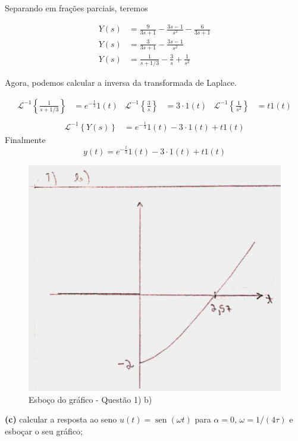 \documentclass{article}
\DeclareMathOperator{\sen}{sen}
\begin{document}
Separando em frações parciais, teremos

\begin{align*}
    Y(s) &= \frac{9}{3s + 1} - \frac{3s - 1}{s^2} - \frac{6}{3s + 1}\\
    Y(s) &= \frac{3}{3s + 1} - \frac{3s - 1}{s^2}\\
    Y(s) &= \frac{1}{s + 1/3} - \frac{3}{s} + \frac{1}{s^2}
\end{align*}

Agora, podemos calcular a inversa da transformada de Laplace.

\begin{align*}
    \mathcal{L}^{-1} \left\{\frac{1}{s + 1/3}\right\} &= e^{-\frac{t}{3}}1(t) & \mathcal{L}^{-1} \left\{\frac{3}{s}\right\} &= 3\cdot1(t) & \mathcal{L}^{-1} \left\{\frac{1}{s^2}\right\} &= t1(t)\\
\end{align*}
\begin{align*}
    \mathcal{L}^{-1} \left\{Y(s)\right\} &= e^{-\frac{t}{3}}1(t) - 3\cdot1(t) + t1(t)
\end{align*}
Finalmente
\[y(t) = e^{-\frac{t}{3}}1(t) - 3\cdot1(t) + t1(t)\]

\begin{figure}[h]
    \includegraphics[scale=0.25]{Q1_b.png}
    \centering
    \caption{Esboço do gráfico - Questão 1) b)}
\end{figure}

\textbf{(c)} calcular a resposta ao seno $u(t) = \sen(\omega t)$ para $\alpha = 0,\, \omega = 1/(4\tau)$ e esboçar o seu gráfico;
\end{document}
